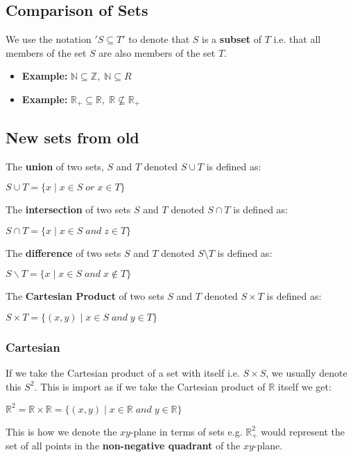 \documentclass[12pt, letterpaper]{article}
\begin{document}
\subsection{Comparison of Sets}
We use the notation $'S \subseteq T'$ to denote that $S$ is a \textbf{subset} of $T$ i.e. that all members of the set $S$ are also members of the set $T$.
\begin{itemize}
	\item \textbf{Example:} $\mathbb{N} \subseteq \mathbb{Z},\; \mathbb{N} \subseteq{R}$
	\item \textbf{Example:} $\mathbb{R_+} \subseteq \mathbb{R}, \; \mathbb{R} \nsubseteq \mathbb{R_+}$
\end{itemize}
\subsection{New sets from old}
The \textbf{union} of two sets, $S$ and $T$ denoted $S \cup T$ is defined as:
\begin{center}
	$ S\cup T = \{x\;|\; x \in S\; or\; x \in T\}$
\end{center}
The \textbf{intersection} of two sets $S$ and $T$ denoted $S \cap T$ is defined as:
\begin{center}
	$S \cap T = \{x\;|\; x \in S\; and\; z \in T\}$
\end{center}
The \textbf{difference} of two sets $S$ and $T$ denoted $S \setminus T$ is defined as:
\begin{center}
	$S\backslash T = \{x\;|\; x \in S\; and\; x \notin T\}$
\end{center}
The \textbf{Cartesian Product} of two sets $S$ and $T$ denoted $S \times T$ is defined as:
\begin{center}
	$S \times T = \{(x, y)\;|\;x \in S\; and\; y \in T\}$
\end{center}
\subsubsection{Cartesian}
If we take the Cartesian product of a set with itself i.e. $S \times S$, we usually denote this $S^2$. This is import as if we take the Cartesian product of $\mathbb{R}$ itself we get:
\begin{center}
	$\mathbb{R}^2 = \mathbb{R\times R} = \{(x,y) \; | \; x \in \mathbb{R} \; and \; y \in \mathbb{R}\}$
\end{center}
This is how we denote the $xy$-plane in terms of sets e.g. $\mathbb{R}^2_+$ would represent the set of all points in the \textbf{non-negative quadrant} of the $xy$-plane. 
\end{document}
